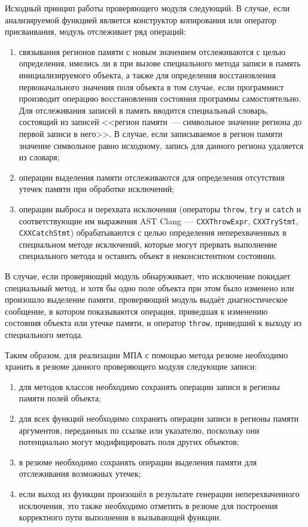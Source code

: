 Исходный принцип работы проверяющего модуля следующий. В случае, если анализируемой функцией является конструктор копирования или оператор присваивания, модуль отслеживает ряд операций: 
\begin{enumerate}
 \item связывания регионов памяти с новым значением отслеживаются с целью определения, имелись ли в при вызове специального метода записи в память инициализируемого объекта, а также для определения восстановления первоначального значения поля объекта в том случае, если программист производит операцию восстановления состояния программы самостоятельно. Для отслеживания записей в память вводится специальный словарь, состоящий из записей <<регион памяти~--- символьное значение региона до первой записи в него>>. В случае, если записываемое в регион памяти значение символьное равно исходному, запись для данного региона удаляется из словаря;
 \item операции выделения памяти отслеживаются для определения отсутствия утечек памяти при обработке исключений;
 \item операции выброса и перехвата исключения (операторы \texttt{throw}, \texttt{try} и \texttt{catch} и соответствующие им выражения AST Clang~--- \texttt{CXXThrowExpr}, \texttt{CXXTryStmt}, \texttt{CXXCatchStmt}) обрабатываются с целью определения неперехваченных в специальном методе исключений, которые могут прервать выполнение специального метода и оставить объект в неконсистентном состоянии.
\end{enumerate}

В случае, если проверяющий модуль обнаруживает, что исключение покидает специальный метод, и хотя бы одно поле объекта при этом было изменено или произошло выделение памяти, проверяющий модуль выдаёт диагностическое сообщение, в котором показываются операция, приведшая к изменению состояния объекта или утечке памяти, и оператор \texttt{throw}, приведший к выходу из специального метода.

Таким образом, для реализации МПА с помощью метода резюме необходимо хранить в резюме данного проверяющего модуля следующие записи:

\begin{enumerate}
 \item для методов классов необходимо сохранять операции записи в регионы памяти полей объекта;
 \item для всех функций необходимо сохранять операции записи в регионы памяти аргументов, переданных по ссылке или указателю, поскольку они потенциально могут модифицировать поля других объектов;
 \item в резюме необходимо сохранять операции выделения памяти для отслеживания возможных утечек;
 \item если выход из функции произошёл в результате генерации неперехваченного исключения, это также необходимо отметить в резюме для построения корректного пути выполнения в вызывающей функции.
\end{enumerate}

